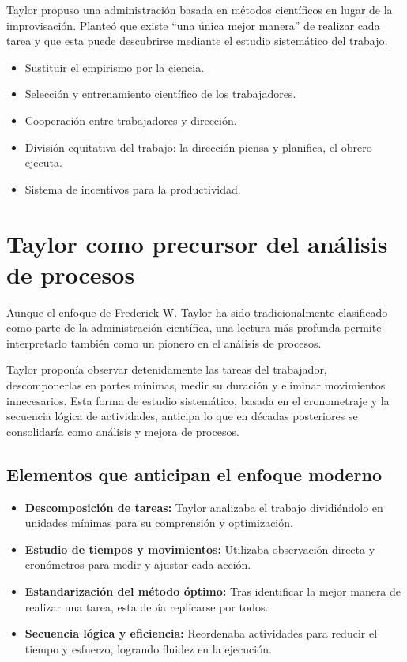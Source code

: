 \documentclass[a4paper,12pt]{article}
\begin{document}
	Taylor propuso una administración basada en métodos científicos en lugar de la improvisación. Planteó que existe ``una única mejor manera'' de realizar cada tarea y que esta puede descubrirse mediante el estudio sistemático del trabajo.
	
	\begin{itemize}
		\item Sustituir el empirismo por la ciencia.
		\item Selección y entrenamiento científico de los trabajadores.
		\item Cooperación entre trabajadores y dirección.
		\item División equitativa del trabajo: la dirección piensa y planifica, el obrero ejecuta.
		\item Sistema de incentivos para la productividad.
	\end{itemize}
	
	\section{Taylor como precursor del análisis de procesos}
	
	Aunque el enfoque de Frederick W. Taylor ha sido tradicionalmente clasificado como parte de la administración científica, una lectura más profunda permite interpretarlo también como un pionero en el análisis de procesos.
	
	Taylor proponía observar detenidamente las tareas del trabajador, descomponerlas en partes mínimas, medir su duración y eliminar movimientos innecesarios. Esta forma de estudio sistemático, basada en el cronometraje y la secuencia lógica de actividades, anticipa lo que en décadas posteriores se consolidaría como análisis y mejora de procesos.
	
	\subsection*{Elementos que anticipan el enfoque moderno}
	\begin{itemize}
		\item \textbf{Descomposición de tareas:} Taylor analizaba el trabajo dividiéndolo en unidades mínimas para su comprensión y optimización.
		\item \textbf{Estudio de tiempos y movimientos:} Utilizaba observación directa y cronómetros para medir y ajustar cada acción.
		\item \textbf{Estandarización del método óptimo:} Tras identificar la mejor manera de realizar una tarea, esta debía replicarse por todos.
		\item \textbf{Secuencia lógica y eficiencia:} Reordenaba actividades para reducir el tiempo y esfuerzo, logrando fluidez en la ejecución.
	\end{itemize}
	
\end{document}
